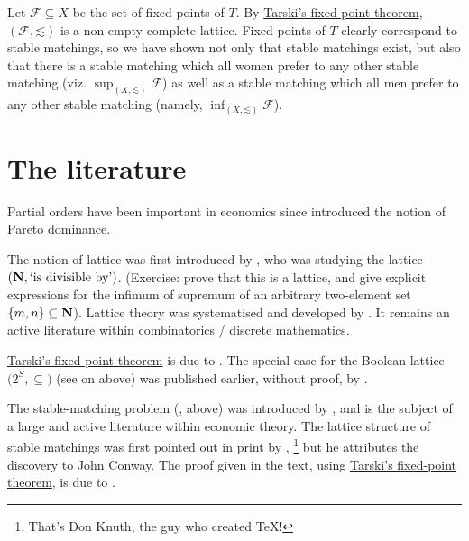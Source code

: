 \begin{example}[matching]
	Let $\mathcal{F} \subseteq X$ be the set of fixed points of $T$. By \hyperref[theorem:tarski]{Tarski's fixed-point theorem}, $(\mathcal{F},\mathord{\lesssim})$ is a non-empty complete lattice.
	Fixed points of $T$ clearly correspond to stable matchings, so we have shown not only that stable matchings exist, but also that there is a stable matching which all women prefer to any other stable matching (viz. $\sup_{(X,\mathord{\lesssim})} \mathcal{F}$) as well as a stable matching which all men prefer to any other stable matching (namely, $\inf_{(X,\mathord{\lesssim})} \mathcal{F}$).
\end{example}



\section{The literature}
\label{tar:lit}

Partial orders have been important in economics since \textcite{Pareto1906} introduced the notion of Pareto dominance.

The notion of lattice was first introduced by \textcite{Dedekind1897}, who was studying the lattice $(\mathbf{N}, \text{`is divisible by'})$. (Exercise: prove that this is a lattice, and give explicit expressions for the infimum of supremum of an arbitrary two-element set $\{m,n\} \subseteq \mathbf{N}$). Lattice theory was systematised and developed by \textcite{Birkhoff1940,Birkhoff1948,Birkhoff1967}. It remains an active literature within combinatorics / discrete mathematics.

\hyperref[theorem:tarski]{Tarski's fixed-point theorem} is due to \textcite{Tarski1955}. The special case for the Boolean lattice $\bigl( 2^S, \subseteq \bigr)$ (see  on  above) was published earlier, without proof, by \textcite{KnasterTarski1928}.

The stable-matching problem (,  above) was introduced by \textcite{GaleShapley1962}, and is the subject of a large and active literature within economic theory. The lattice structure of stable matchings was first pointed out in print by \textcite{Knuth1976},%
	\footnote{That's Don Knuth, the guy who created \TeX!}
but he attributes the discovery to John Conway. The proof given in the text, using \hyperref[theorem:tarski]{Tarski's fixed-point theorem}, is due to \textcite{Adachi2000}.

